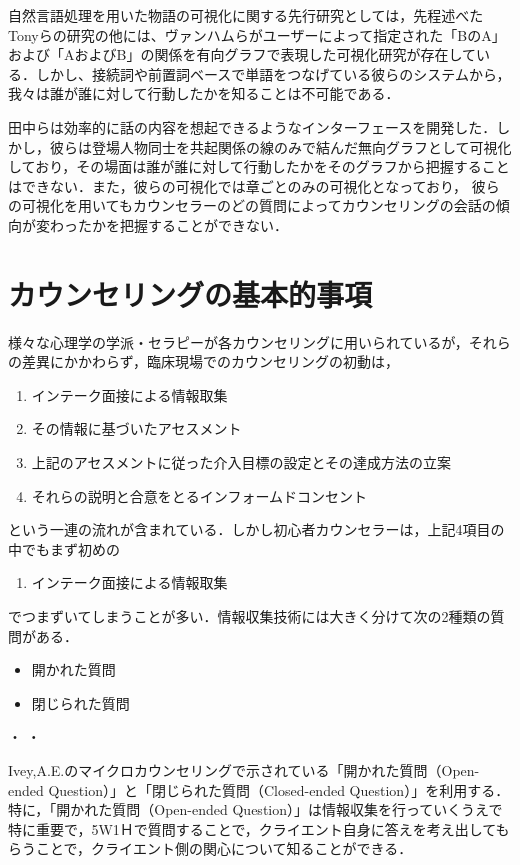 \documentclass[shuuron]{kuee}
\begin{document}
自然言語処理を用いた物語の可視化に関する先行研究としては，先程述べたTonyら\cite{bergstrom2007seeing}の研究の他には、ヴァンハム\cite{van2009mapping}らがユーザーによって指定された「BのA」および「AおよびB」の関係を有向グラフで表現した可視化研究が存在している．しかし、接続詞や前置詞ベースで単語をつなげている彼らのシステムから，我々は誰が誰に対して行動したかを知ることは不可能である．

田中ら\cite{tanaka}は効率的に話の内容を想起できるようなインターフェースを開発した．しかし，彼らは登場人物同士を共起関係の線のみで結んだ無向グラフとして可視化しており，その場面は誰が誰に対して行動したかをそのグラフから把握することはできない．また，彼らの可視化では章ごとのみの可視化となっており， 彼らの可視化を用いてもカウンセラーのどの質問によってカウンセリングの会話の傾向が変わったかを把握することができない．



\chapter{カウンセリングの基本的事項}

様々な心理学の学派・セラピーが各カウンセリングに用いられているが，それらの差異にかかわらず，臨床現場でのカウンセリングの初動は，

\begin{enumerate}
 \item インテーク面接による情報取集
 \item その情報に基づいたアセスメント
 \item 上記のアセスメントに従った介入目標の設定とその達成方法の立案
 \item それらの説明と合意をとるインフォームドコンセント
\end{enumerate}
という一連の流れが含まれている．しかし初心者カウンセラーは，上記4項目の中でもまず初めの
\begin{enumerate}
 \item インテーク面接による情報取集
\end{enumerate}
でつまずいてしまうことが多い．情報収集技術には大きく分けて次の2種類の質問がある．
\begin{itemize}
\item 開かれた質問
\item 閉じられた質問
\end{itemize}
・
・


Ivey,A.E.\cite{ivey}のマイクロカウンセリングで示されている「開かれた質問（Open-ended Question）」と「閉じられた質問（Closed-ended Question）」を利用する．特に，「開かれた質問（Open-ended Question）」は情報収集を行っていくうえで特に重要で，5W1Ｈで質問することで，クライエント自身に答えを考え出してもらうことで，クライエント側の関心について知ることができる．
\end{document}
